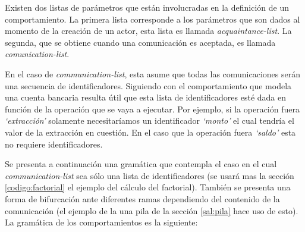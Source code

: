 Existen dos listas de parámetros que están involucradas en la definición de un comportamiento. La primera lista corresponde a los parámetros que son dados al momento de la creación de un actor, esta lista es llamada \textit{acquaintance-list}. La segunda, que se obtiene cuando una comunicación es aceptada, es llamada \textit{comunication-list}.

En el caso de \textit{communication-list}, esta asume que todas las comunicaciones serán una secuencia de identificadores. Siguiendo con el comportamiento que modela una cuenta bancaria resulta útil que esta lista de identificadores esté dada en función de la operación que se vaya a ejecutar. Por ejemplo, si la operación fuera \textit{`extracción'} solamente necesitaríamos un identificador \textit{`monto'} el cual tendría el valor de la extracción en cuestión. En el caso que la operación fuera \textit{`saldo'} esta no requiere identificadores. 

Se presenta a continuación una gramática que contempla el caso en el cual \textit{communication-list} sea sólo una lista de identificadores (se usará mas la sección \ref{codigo:factorial} el ejemplo del cálculo del factorial). También se presenta una forma de bifurcación ante diferentes ramas dependiendo del contenido de la comunicación (el ejemplo de la una pila de la sección \ref{sal:pila} hace uso de esto). La gramática de los comportamientos es la siguiente:

